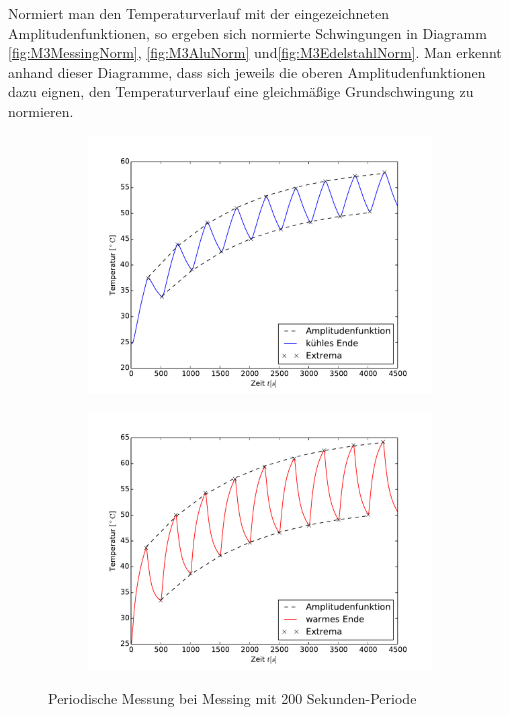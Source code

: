 Normiert man den Temperaturverlauf mit der eingezeichneten Amplitudenfunktionen, so ergeben sich normierte Schwingungen in Diagramm \ref{fig:M3MessingNorm}, \ref{fig:M3AluNorm} und\ref{fig:M3EdelstahlNorm}. Man erkennt anhand dieser Diagramme, dass sich jeweils die oberen Amplitudenfunktionen dazu eignen, den Temperaturverlauf eine gleichmäßige Grundschwingung zu normieren.

\begin{figure}[htp]
\label{fig:M3Messing}
\centering
	\begin{subfigure}{0.9\textwidth}
	\includegraphics[width=\textwidth]{Bilder/M3_Messing_kuehl.pdf}
	\end{subfigure}
	\begin{subfigure}{0.9\textwidth}
	\includegraphics[width=\textwidth]{Bilder/M3_Messing_warm.pdf}
	\end{subfigure}
\caption{Periodische Messung bei Messing mit 200 Sekunden-Periode}
\end{figure}

